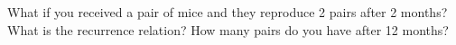 What if you received a pair of mice and they reproduce 2 pairs after 2 months?
What is the recurrence relation?
How many pairs do you have after 12 months?
